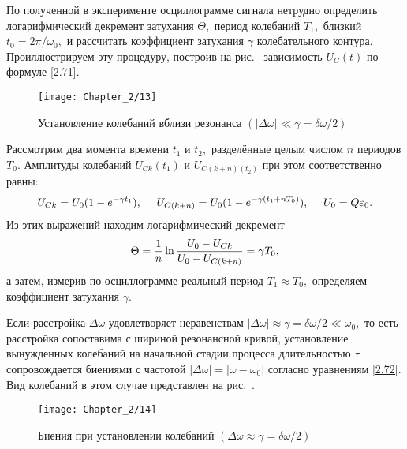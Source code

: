По полученной в эксперименте осциллограмме сигнала нетрудно определить логарифмический декремент затухания $\Theta,$ период колебаний $T_1,$ близкий $t_0=2\pi/\omega_0,$ и рассчитать коэффициент затухания $\gamma$ колебательного контура. Проиллюстрируем эту процедуру, построив на рис.~ зависимость $U_C(t)$ по формуле \eqref{2.71}.

\begin{figure}[h!]
	\centering\texttt{[image: Chapter\_2/13]}
	\caption{Установление колебаний вблизи резонанса $(|\Delta\omega|\ll\gamma=\delta\omega/2)$}
\end{figure}

Рассмотрим два момента времени $t_1$ и $t_2,$ разделённые целым числом $n$ периодов $T_0.$ Амплитуды колебаний $U_{Ck}(t_1)$ и $U_{C(k+n)(t_2)}$ при этом соответственно равны:
\begin{equation}\eqmark{2.74}
U_{Ck}=U_0(1-e^{-\gamma t_1}),~~~~U_{C(k+n)}=U_0(1-e^{-\gamma(t_1+nT_0)}),~~~~U_0=Q\varepsilon_0.
\end{equation}
Из этих выражений находим логарифмический декремент
\begin{equation}\eqmark{2.75}
\Theta=\dfrac{1}{n}\ln\dfrac{U_0-U_{Ck}}{U_0-U_{C(k+n)}}=\gamma T_0,
\end{equation}
а затем, измерив по осциллограмме реальный период $T_1\approx T_0,$ определяем коэффициент затухания $\gamma.$

Если расстройка $\Delta\omega$ удовлетворяет неравенствам $|\Delta\omega|\approx\gamma=\delta\omega/2\ll\omega_0,$ то есть расстройка сопоставима с шириной резонансной кривой, установление вынужденных колебаний на начальной стадии процесса длительностью $\tau$ сопровождается биениями с частотой $|\Delta\omega|=|\omega-\omega_0|$ согласно уравнениям \eqref{2.72}. Вид колебаний в этом случае представлен на рис.~.

\begin{figure}[h!]
	\centering\texttt{[image: Chapter\_2/14]}
	\caption{Биения при установлении колебаний $(\Delta\omega\approx\gamma=\delta\omega/2)$}
\end{figure}

